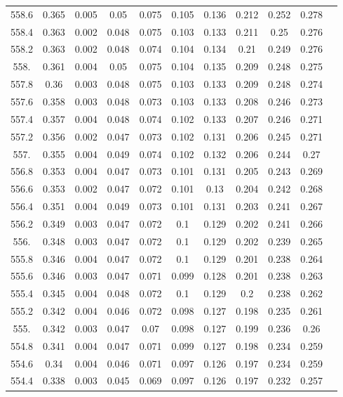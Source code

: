 \documentclass[12pt]{ctexart}
\numberwithin{equation}{section}
\begin{document}
\begin{longtable}{ccccccccccc}
558.6	&	0.365	&	0.005	&	0.05	&	0.075	&	0.105	&	0.136	&	0.212	&	0.252	&	0.278	\\
558.4	&	0.363	&	0.002	&	0.048	&	0.075	&	0.103	&	0.133	&	0.211	&	0.25	&	0.276	\\
558.2	&	0.363	&	0.002	&	0.048	&	0.074	&	0.104	&	0.134	&	0.21	&	0.249	&	0.276	\\
558.	&	0.361	&	0.004	&	0.05	&	0.075	&	0.104	&	0.135	&	0.209	&	0.248	&	0.275	\\
557.8	&	0.36	&	0.003	&	0.048	&	0.075	&	0.103	&	0.133	&	0.209	&	0.248	&	0.274	\\
557.6	&	0.358	&	0.003	&	0.048	&	0.073	&	0.103	&	0.133	&	0.208	&	0.246	&	0.273	\\
557.4	&	0.357	&	0.004	&	0.048	&	0.074	&	0.102	&	0.133	&	0.207	&	0.246	&	0.271	\\
557.2	&	0.356	&	0.002	&	0.047	&	0.073	&	0.102	&	0.131	&	0.206	&	0.245	&	0.271	\\
557.	&	0.355	&	0.004	&	0.049	&	0.074	&	0.102	&	0.132	&	0.206	&	0.244	&	0.27	\\
556.8	&	0.353	&	0.004	&	0.047	&	0.073	&	0.101	&	0.131	&	0.205	&	0.243	&	0.269	\\
556.6	&	0.353	&	0.002	&	0.047	&	0.072	&	0.101	&	0.13	&	0.204	&	0.242	&	0.268	\\
556.4	&	0.351	&	0.004	&	0.049	&	0.073	&	0.101	&	0.131	&	0.203	&	0.241	&	0.267	\\
556.2	&	0.349	&	0.003	&	0.047	&	0.072	&	0.1	&	0.129	&	0.202	&	0.241	&	0.266	\\
556.	&	0.348	&	0.003	&	0.047	&	0.072	&	0.1	&	0.129	&	0.202	&	0.239	&	0.265	\\
555.8	&	0.346	&	0.004	&	0.047	&	0.072	&	0.1	&	0.129	&	0.201	&	0.238	&	0.264	\\
555.6	&	0.346	&	0.003	&	0.047	&	0.071	&	0.099	&	0.128	&	0.201	&	0.238	&	0.263	\\
555.4	&	0.345	&	0.004	&	0.048	&	0.072	&	0.1	&	0.129	&	0.2	&	0.238	&	0.262	\\
555.2	&	0.342	&	0.004	&	0.046	&	0.072	&	0.098	&	0.127	&	0.198	&	0.235	&	0.261	\\
555.	&	0.342	&	0.003	&	0.047	&	0.07	&	0.098	&	0.127	&	0.199	&	0.236	&	0.26	\\
554.8	&	0.341	&	0.004	&	0.047	&	0.071	&	0.099	&	0.127	&	0.198	&	0.234	&	0.259	\\
554.6	&	0.34	&	0.004	&	0.046	&	0.071	&	0.097	&	0.126	&	0.197	&	0.234	&	0.259	\\
554.4	&	0.338	&	0.003	&	0.045	&	0.069	&	0.097	&	0.126	&	0.197	&	0.232	&	0.257	\\

\end{longtable}
\end{document}
